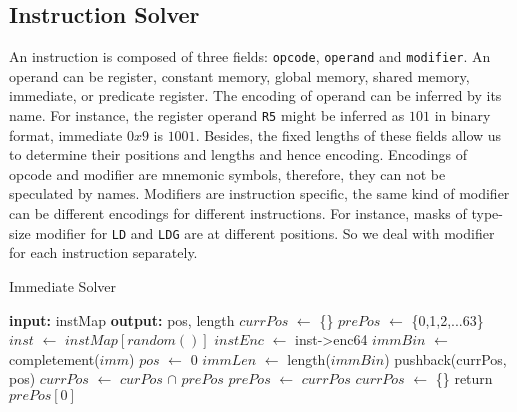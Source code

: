 \subsection{Instruction Solver}


An instruction is composed of three fields: {\tt opcode}, {\tt operand} and {\tt modifier}. An operand can be register, constant memory, global memory, shared memory, immediate, or predicate register.
The encoding of operand can be inferred by its name. For instance, the register operand {\tt R5} might be
inferred as $101$ in binary format, immediate $0x9$ is $1001$. Besides, the fixed lengths of these fields allow us to determine their positions and lengths and hence encoding. Encodings of opcode and modifier are mnemonic symbols, therefore, they can not be speculated by names. Modifiers are instruction specific, the same kind of modifier can be different encodings for different instructions. For instance, masks of type-size
modifier for {\tt LD} and {\tt LDG} are at different positions. So we deal with modifier for each instruction separately. 


\begin{algorithm}
      \caption{Immediate Solver}
      \label{algo:int_solver}
  \begin{algorithmic}[1]
	  \State \textbf{input:} instMap
      \State \textbf{output:} pos, length
      \State $currPos$ $\gets$ \{\}
      \State $prePos$ $\gets$ \{0,1,2,...63\}
      \State $inst$ $\gets$ $instMap[random()]$
      \State $instEnc$ $\gets$ inst->enc64
      \State $immBin$ $\gets$ completement($imm$)
      \State $pos$ $\gets$ 0
      \State $immLen$ $\gets$ length($immBin$)
      \State pushback(currPos, pos)
      \EndIf
      \EndWhile
      \State $currPos$ $\gets$ $curPos$ $\cap$ $prePos$
      \State $prePos$ $\gets$ $currPos$
      \State $currPos$ $\gets$ \{\}
      \EndIf
      \EndWhile
      \State return $prePos[0]$
  \end{algorithmic}
\end{algorithm}

